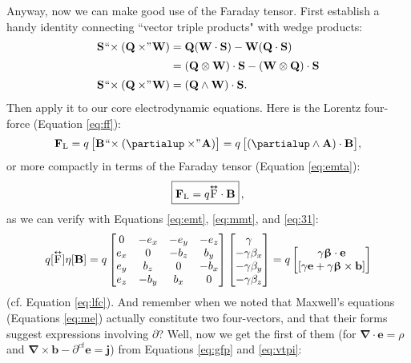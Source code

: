 \documentclass[12pt]{article}
\renewcommand{\vv}[1]{\mathbf{#1}}
\newcommand{\vvbeta}{\bm{\upbeta}}
\newcommand{\del}{\boldsymbol{\nabla}}
\newcommand{\capdy}[1]{ \overset{ \text{\tiny$\bm\leftrightarrow$} }{\vphantom{\text{\small{A}}}\smash{#1}} }
\begin{document}
Anyway, now we can make good use of the Faraday tensor. First establish a handy identity connecting ``vector triple products" with wedge products:
\begin{equation}\label{eq:vtpi}
\begin{split}
\vv S \mkern1mu `` \mkern-4mu \times (\vv Q \times \mkern-4mu " \mkern1mu \vv W) &= \vv Q ( \vv W \cdot \vv S) - \vv W ( \vv Q \cdot \vv S)  \\[2pt]
&= ( \vv Q \otimes \vv W ) \cdot \vv S - ( \vv W \otimes \vv Q ) \cdot \vv S \\[2pt]
\vv S \mkern1mu `` \mkern-4mu \times (\vv Q \times \mkern-4mu " \mkern1mu \vv W) &= ( \vv Q \wedge \vv W ) \cdot \vv S .
\end{split}
\end{equation}
Then apply it to our core electrodynamic equations. Here is the Lorentz four-force (Equation \ref{eq:ff}):
\begin{equation*}
\vv F_{\textrm{L}} = q \, \bigl[ \vv B \mkern1mu `` \mkern-4mu \times (\partialup \times \mkern-4mu " \mkern1mu \vv A) \bigr] = q \, \bigl[ (\partialup \wedge \vv A) \cdot \vv B \bigr] ,
\end{equation*}
or more compactly in terms of the Faraday tensor (Equation \ref{eq:emta}):
\begin{equation}\label{eq:lfffd}
\boxed{ \vphantom{A_{A_A}} \vv F_{\mathrm{L}} = q \capdy{\mathrm{F}} \cdot \vv B } \, ,
\end{equation}
as we can verify with Equations \ref{eq:emt}, \ref{eq:mmt}, and \ref{eq:31}:
\begin{equation*}
q [\capdy{\mathrm{F}}] \eta [\vv B]
=
q
\begin{bmatrix}
0 & -e_x & -e_y & -e_z \\
e_x & 0 & -b_z & b_y \\
e_y & b_z & 0 & -b_x \\
e_z & -b_y & b_x & 0
\end{bmatrix}
\begin{bmatrix}
\gamma \\
- \gamma \beta_x \\
- \gamma \beta_y \\
- \gamma \beta_z
\end{bmatrix}
=
q
\begin{bmatrix}
\gamma \vvbeta \cdot \vv e \\
[ \gamma \vv e + \gamma \vvbeta \times \vv b ]
\end{bmatrix}
\end{equation*}
(cf. Equation \ref{eq:lfc}). And remember when we noted that Maxwell's equations (Equations \ref{eq:me}) actually constitute two four-vectors, and that their forms suggest expressions involving $\partialup$? Well, now we get the first of them (for $\del \cdot \vv e = \rho$ and $ \del \times \vv b - \partial^{ct} \vv e = \vv j$) from Equations \ref{eq:gfp} and \ref{eq:vtpi}:
\end{document}
